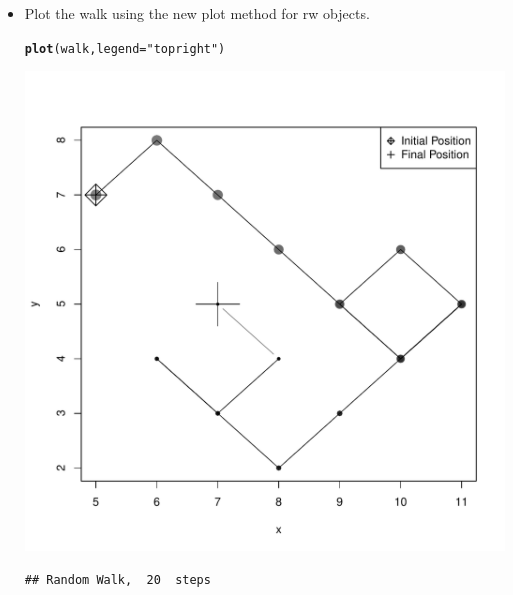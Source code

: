 \documentclass{llncs}\usepackage[]{graphicx}\usepackage[]{color}
\makeatletter
\def\maxwidth{ %
  \ifdim\Gin@nat@width>\linewidth
    \linewidth
  \else
    \Gin@nat@width
  \fi
}
\newcommand{\hlstr}[1]{\textcolor[rgb]{0.192,0.494,0.8}{#1}}%
\newcommand{\hlstd}[1]{\textcolor[rgb]{0.345,0.345,0.345}{#1}}%
\newcommand{\hlkwc}[1]{\textcolor[rgb]{0.333,0.667,0.333}{#1}}%
\newcommand{\hlkwd}[1]{\textcolor[rgb]{0.737,0.353,0.396}{\textbf{#1}}}%
\newenvironment{kframe}{%
 \def\at@end@of@kframe{}%
 \ifinner\ifhmode%
  \def\at@end@of@kframe{\end{minipage}}%
  \begin{minipage}{\columnwidth}%
 \fi\fi%
 \def\FrameCommand##1{\hskip\@totalleftmargin \hskip-\fboxsep
 \colorbox{shadecolor}{##1}\hskip-\fboxsep
     \hskip-\linewidth \hskip-\@totalleftmargin \hskip\columnwidth}%
 \MakeFramed {\advance\hsize-\width
   \@totalleftmargin\z@ \linewidth\hsize
   \@setminipage}}%
 {\par\unskip\endMakeFramed%
 \at@end@of@kframe}
\newenvironment{knitrout}{}{} %
\makeatother
\begin{document}
\begin{itemize}
\begin{knitrout}
\end{knitrout}
\item Plot the walk using the new plot method for rw objects.
\begin{knitrout}
\color{fgcolor}\begin{kframe}
\begin{alltt}
\hlkwd{plot}\hlstd{(walk,}\hlkwc{legend}\hlstd{=}\hlstr{"topright"}\hlstd{)}
\end{alltt}
\end{kframe}
\includegraphics[width=\maxwidth]{figure/unnamed-chunk-30-1} 
\begin{kframe}\begin{lstlisting}[basicstyle=\ttfamily,breaklines=true]
## Random Walk,  20  steps
\end{lstlisting}
\end{kframe}
\end{knitrout}
\end{itemize}
\end{document}
